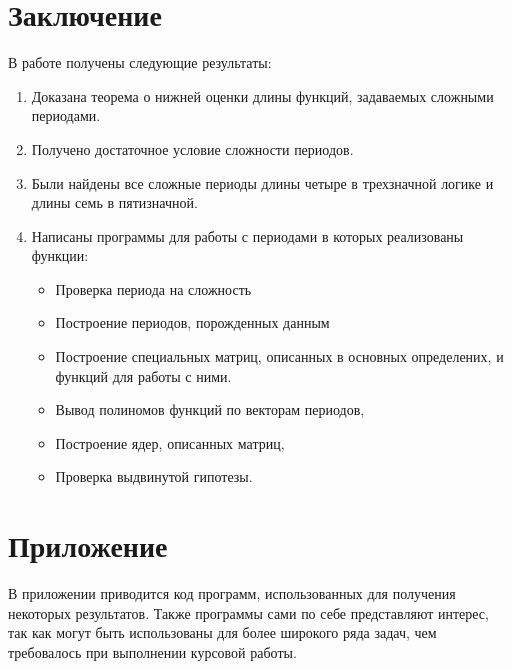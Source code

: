 \documentclass[bibliography=totoc, a4paper, 12pt]{extarticle}
\let\stdsection\section
\renewcommand\section{\newpage\stdsection}
\begin{document}
\section{Заключение}
В работе получены следующие результаты:
\begin{enumerate}
\item Доказана теорема о нижней оценки длины функций, задаваемых сложными периодами.

\item Получено достаточное условие сложности периодов.

\item Были найдены все сложные периоды длины четыре в трехзначной логике и длины семь в пятизначной.

\item Написаны программы для работы с периодами в которых реализованы функции:
\begin{itemize}
\item Проверка периода на сложность
\item Построение периодов, порожденных данным
\item Построение специальных матриц, описанных в основных определених,
и функций для работы с ними.
\item Вывод полиномов функций по векторам периодов,
\item Построение ядер, описанных матриц,
\item Проверка выдвинутой гипотезы.
\end{itemize}
\end{enumerate}


\section{Приложение}

В приложении приводится код программ, использованных для получения некоторых
результатов. Также программы сами по себе представляют интерес, так как могут
быть использованы для более широкого ряда задач, чем требовалось при
выполнении курсовой работы.
\end{document}
